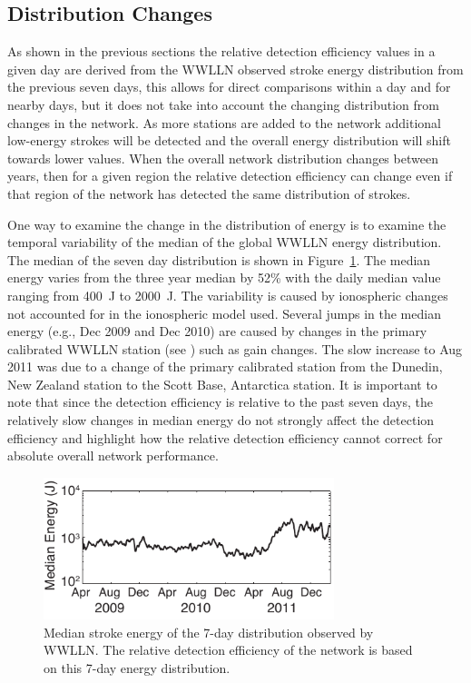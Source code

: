 \subsection{Distribution Changes}

As shown in the previous sections the relative detection efficiency values in a given day are derived from the WWLLN observed stroke energy distribution from the previous seven days, this allows for direct comparisons within a day and for nearby days, but it does not take into account the changing distribution from changes in the network.
As more stations are added to the network additional low-energy strokes will be detected and the overall energy distribution will shift towards lower values.
When the overall network distribution changes between years, then for a given region the relative detection efficiency can change even if that region of the network has detected the same distribution of strokes.

One way to examine the change in the distribution of energy is to examine the temporal variability of the median of the global WWLLN energy distribution.
The median of the seven day distribution is shown in Figure~\ref{efficiency:fig:MedianEnergy}.
The median energy varies from the three year median by 52\% with the daily median value ranging from 400~J to 2000~J.
The variability is caused by ionospheric changes not accounted for in the ionospheric model used.
Several jumps in the median energy (e.g., Dec 2009 and Dec 2010) are caused by changes in the primary calibrated WWLLN station (see \citet{Hutchins2012}) such as gain changes.
The slow increase to Aug 2011 was due to a change of the primary calibrated station from the Dunedin, New Zealand station to the Scott Base, Antarctica station.
It is important to note that since the detection efficiency is relative to the past seven days, the relatively slow changes in median energy do not strongly affect the detection efficiency and highlight how the relative detection efficiency cannot correct for absolute overall network performance.

\begin{figure}[ht!]
   \centering
\noindent\includegraphics[width=20pc]{efficiency/Figures/2012RS005049-f8.pdf}
   \caption{Median stroke energy of the 7-day distribution observed by WWLLN.
The relative detection efficiency of the network is based on this 7-day energy distribution.}
   \label{efficiency:fig:MedianEnergy}
\end{figure}


